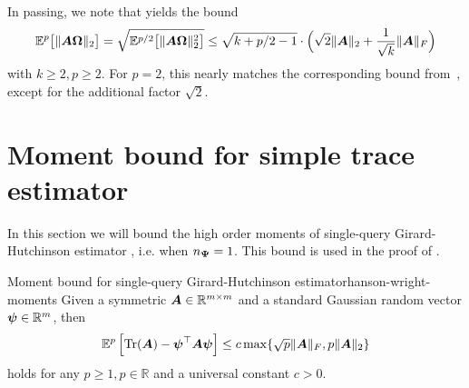 In passing, we note that   yields the bound
    \begin{equation}
        \mathbb{E}^{p}\big[ \lVert \boldsymbol{A} \boldsymbol{\Omega} \rVert _2 \big] = \sqrt{\mathbb{E}^{p/2}\big[ \lVert \boldsymbol{A} \boldsymbol{\Omega} \rVert _2^2 \big]} \leq \sqrt{k + p/2-1} \cdot \Big(\sqrt{2} \lVert \boldsymbol{A} \rVert _2 + \frac{1}{\sqrt{k}}\lVert \boldsymbol{A} \rVert_F\Big)
    \end{equation}
    with $k\ge 2, p\ge 2$. For $p = 2$, this nearly matches the corresponding bound from~\cite[Lemma B.1]{tropp-2023-randomized-algorithms}, except for the additional factor $\sqrt{2}$.

\color{black}
\section{Moment bound for simple trace estimator}

In this section we will bound the high order moments of single-query Girard-Hutchinson estimator , i.e. when $n_{\boldsymbol{\Psi}} = 1$. This bound is used in the proof of .

\begin{lemma}{Moment bound for single-query Girard-Hutchinson estimator}{hanson-wright-moments}
    Given a symmetric $\boldsymbol{A} \in \mathbb{R}^{m \times m}$ and a standard Gaussian random vector $\boldsymbol{\psi} \in \mathbb{R}^{m}$, then
    \begin{equation}
        \mathbb{E}^{p}\left[\operatorname{Tr}(\boldsymbol{A}) - \boldsymbol{\psi}^{\top} \boldsymbol{A} \boldsymbol{\psi}\right] \leq c \max\{ \sqrt{p} \lVert \boldsymbol{A} \rVert _F, p \lVert \boldsymbol{A} \rVert _2 \}
    \end{equation}
    holds for any $p \geq 1, p \in \mathbb{R}$ and a universal constant $c > 0$.
\end{lemma}

